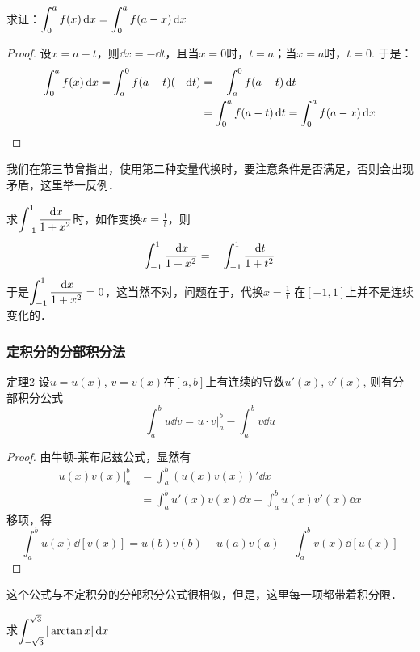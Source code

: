 \begin{example}
求证：$\displaystyle\int^a_0 f(x)\,{\rm d} x=\displaystyle\int^a_0 f(a-x)\,{\rm d} x$
\end{example}

\begin{proof}
    设$x=a-t$，则$\dd x=-\dd t$，且当$x=0$时，$t=a$；当$x=a$时，$t=0$. 于是：
\[\begin{split}
    \displaystyle\int^a_0 f(x)\,{\rm d} x=\int^0_a f(a-t)(-\,{\rm d} t)&=-\int^0_a f(a-t)\,{\rm d} t\\
    &=\int^a_0 f(a-t)\,{\rm d} t=\displaystyle\int^a_0 f(a-x)\,{\rm d} x
\end{split}\]
\end{proof}

我们在第三节曾指出，使用第二种变量代换时，要注意条件是否满足，否则会出现矛盾，这里举一反例．

求$\displaystyle\int^{1}_{-1}\dfrac{\,{\rm d} x}{1+x^2}$时，如作变换$x=\frac{1}{t}$，则
\[\displaystyle\int^{1}_{-1}\dfrac{\,{\rm d} x}{1+x^2}=-\displaystyle\int^{1}_{-1}\dfrac{\,{\rm d} t}{1+t^2}\]
于是$\displaystyle\int^{1}_{-1}\dfrac{\,{\rm d} x}{1+x^2}=0$，这当然不对，问题在于，代换$x=\frac{1}{t}$
在$[-1,1]$上并不是连续变化的．


\subsubsection{定积分的分部积分法}
\begin{blk}
    {定理2} 设$u=u(x)$, $v=v(x)$在$[a,b]$上有连续的导数$u'(x)$, $v'(x)$, 则有分部积分公式
\[\int^b_a u\dd v=u\cdot v\Big|^b_a- \int^b_a v\dd u\]
\end{blk}

\begin{proof}
    由牛顿-莱布尼兹公式，显然有
\[\begin{split}
    u (x) v (x)\Big|^b_a &=\int^b_a (u (x) v (x) ) '\dd x\\
&=\int^b_a u' (x) v (x) \dd x+\int^b_a u (x) v' (x) \dd x
\end{split}\]
移项，得
\[\int^b_a u (x) \dd [v (x) ] =u (b) v (b) -u (a) v (a) -\int^b_a v (x) \dd [u (x) ] \]
\end{proof}

这个公式与不定积分的分部积分公式很相似，但是，这里每一项都带着积分限．

\begin{example}
求$\displaystyle\int^{\sqrt{3}}_{-\sqrt{3}}|\arctan x|\,{\rm d} x$
\end{example}

